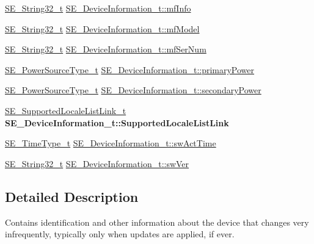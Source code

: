 \begin{DoxyCompactItemize}
\hyperlink{group__String32_gac9f59b06b168b4d2e0d45ed41699af42}{S\+E\+\_\+\+String32\+\_\+t} \hyperlink{group__DeviceInformation_ga191206c92cb8b844c177b5ca3929fb59}{S\+E\+\_\+\+Device\+Information\+\_\+t\+::mf\+Info}
\item 
\hyperlink{group__String32_gac9f59b06b168b4d2e0d45ed41699af42}{S\+E\+\_\+\+String32\+\_\+t} \hyperlink{group__DeviceInformation_gaa34170d067e5cbe470296ab74a692ab3}{S\+E\+\_\+\+Device\+Information\+\_\+t\+::mf\+Model}
\item 
\hyperlink{group__String32_gac9f59b06b168b4d2e0d45ed41699af42}{S\+E\+\_\+\+String32\+\_\+t} \hyperlink{group__DeviceInformation_gae791a02f4f5caefec3aafdc233b8d840}{S\+E\+\_\+\+Device\+Information\+\_\+t\+::mf\+Ser\+Num}
\item 
\hyperlink{group__PowerSourceType_ga196e6e180c5421a97062704daa6a96fc}{S\+E\+\_\+\+Power\+Source\+Type\+\_\+t} \hyperlink{group__DeviceInformation_ga8a5e0fea94c0beb11adc08bb48e24727}{S\+E\+\_\+\+Device\+Information\+\_\+t\+::primary\+Power}
\item 
\hyperlink{group__PowerSourceType_ga196e6e180c5421a97062704daa6a96fc}{S\+E\+\_\+\+Power\+Source\+Type\+\_\+t} \hyperlink{group__DeviceInformation_ga14b35fc277040acdf2c3964cff35e518}{S\+E\+\_\+\+Device\+Information\+\_\+t\+::secondary\+Power}
\item 
\mbox{\label{group__DeviceInformation_ga3473a1dffd0ca2b3971d6597bb18a2fe}} 
\hyperlink{structSE__SupportedLocaleListLink__t}{S\+E\+\_\+\+Supported\+Locale\+List\+Link\+\_\+t} {\bfseries S\+E\+\_\+\+Device\+Information\+\_\+t\+::\+Supported\+Locale\+List\+Link}
\item 
\hyperlink{group__TimeType_ga6fba87a5b57829b4ff3f0e7638156682}{S\+E\+\_\+\+Time\+Type\+\_\+t} \hyperlink{group__DeviceInformation_gaf5c095448352c4991118c909f8eee40e}{S\+E\+\_\+\+Device\+Information\+\_\+t\+::sw\+Act\+Time}
\item 
\hyperlink{group__String32_gac9f59b06b168b4d2e0d45ed41699af42}{S\+E\+\_\+\+String32\+\_\+t} \hyperlink{group__DeviceInformation_ga1291b6f479ed99ca846ffd34beb6c3c0}{S\+E\+\_\+\+Device\+Information\+\_\+t\+::sw\+Ver}
\end{DoxyCompactItemize}


\subsection{Detailed Description}
Contains identification and other information about the device that changes very infrequently, typically only when updates are applied, if ever. 

